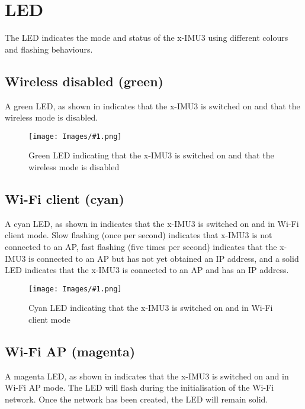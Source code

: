 \section{\acs{LED}}
\label{sec:led}

The \ac{LED} indicates the mode and status of the x-IMU3 using different colours and flashing behaviours.

\newcommand{\ledFigure}[2]{
    \begin{figure}[H]
        \centering
        \texttt{[image: Images/\#1.png]}
        \caption{#2}
        \label{fig:#1}
    \end{figure}
}

\subsection{Wireless disabled (green)}

A green \ac{LED}, as shown in  indicates that the x-IMU3 is switched on and that the wireless mode is disabled.

\ledFigure{greenLed}{Green \acs{LED} indicating that the x-IMU3 is switched on and that the wireless mode is disabled}

\subsection{Wi-Fi client (cyan)}

A cyan \ac{LED}, as shown in  indicates that the x-IMU3 is switched on and in Wi-Fi client mode. Slow flashing (once per second) indicates that x-IMU3 is not connected to an \ac{AP}, fast flashing (five times per second) indicates that the x-IMU3 is connected to an \ac{AP} but has not yet obtained an \ac{IP} address, and a solid \ac{LED} indicates that the x-IMU3 is connected to an \ac{AP} and has an \ac{IP} address.

\ledFigure{cyanLed}{Cyan \acs{LED} indicating that the x-IMU3 is switched on and in Wi-Fi client mode}

\subsection{Wi-Fi AP (magenta)}

A magenta \ac{LED}, as shown in  indicates that the x-IMU3 is switched on and in Wi-Fi \ac{AP} mode.  The \ac{LED} will flash during the initialisation of the Wi-Fi network.  Once the network has been created, the \ac{LED} will remain solid.

